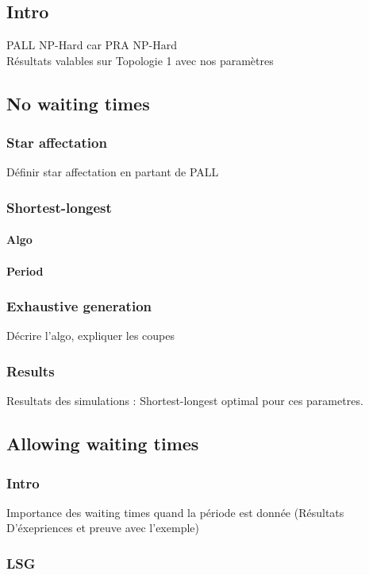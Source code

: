 \documentclass[a4paper,10pt]{article}
\begin{document}
  \subsection{Intro}
    PALL NP-Hard car PRA NP-Hard\\
    Résultats valables sur Topologie 1 avec nos paramètres
    
  \subsection{No waiting times}
    \subsubsection{Star affectation}
      Définir star affectation en partant de PALL
    \subsubsection{Shortest-longest}
      \paragraph{Algo}
      \paragraph{Period}
    \subsubsection{Exhaustive generation}
      Décrire l'algo, expliquer les coupes
    \subsubsection{Results}
      Resultats des simulations : Shortest-longest optimal pour ces parametres.
      
   \subsection{Allowing waiting times}
     \subsubsection{Intro}
	Importance des waiting times quand la période est donnée (Résultats D'éxepriences et preuve avec l'exemple)
     \subsubsection{LSG}
\end{document}
